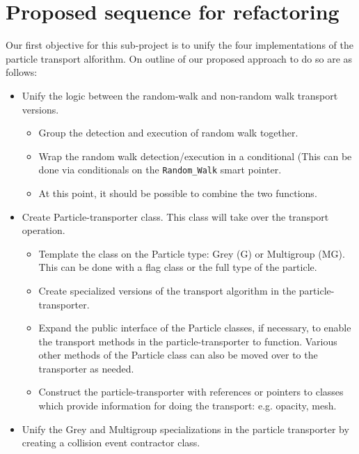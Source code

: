 \documentclass[memo]{ResearchNote}
\begin{document}
\section{Proposed sequence for refactoring}

Our first objective for this sub-project is to unify the four
implementations of the particle transport alforithm. On outline of our
proposed approach to do so are as follows:

\begin{itemize}
\item Unify the logic between the random-walk and non-random walk
  transport versions. 

  \begin{itemize} 
  \item Group the detection and execution of random walk
    together. 
  \item Wrap the random walk detection/execution in a conditional
    (This can be done via conditionals on the {\tt Random\_Walk} smart
    pointer.
  \item At this point, it should be possible to combine the two
    functions.
  \end{itemize}

\item Create Particle-transporter class. This class will take over the
  transport operation.

  \begin{itemize}
  \item Template the class on the Particle type: Grey (G) or
    Multigroup (MG). This can be done with a flag class or the full
    type of the particle.
  \item Create specialized versions of the transport algorithm in the
    particle-transporter.
  \item Expand the public interface of the Particle classes, if
    necessary, to enable the transport methods in the
    particle-transporter to function. Various other methods of the
    Particle class can also be moved over to the transporter as
    needed.
  \item Construct the particle-transporter with references or pointers
    to classes which provide information for doing the transport:
    e.g. opacity, mesh.
  \end{itemize}

\item Unify the Grey and Multigroup specializations in the particle
  transporter by creating a collision event contractor class. 


\end{itemize}
\end{document}
